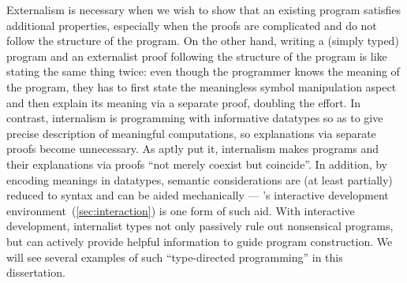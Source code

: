Externalism is necessary when we wish to show that an existing program satisfies additional properties, especially when the proofs are complicated and do not follow the structure of the program.
On the other hand, writing a (simply typed) program and an externalist proof following the structure of the program is like stating the same thing twice: even though the programmer knows the meaning of the program, they has to first state the meaningless symbol manipulation aspect and then explain its meaning via a separate proof, doubling the effort.
In contrast, internalism is programming with informative datatypes so as to give precise description of meaningful computations, so explanations via separate proofs become unnecessary.
As \citet{McBride-Epigram} aptly put it, internalism makes programs and their explanations via proofs ``not merely coexist but coincide''.
In addition, by encoding meanings in datatypes, semantic considerations are (at least partially) reduced to syntax and can be aided mechanically --- \Agda's interactive development environment~(\autoref{sec:interaction}) is one form of such aid.
With interactive development, internalist types not only passively rule out nonsensical programs, but can actively provide helpful information to guide program construction.
We will see several examples of such ``type-directed programming'' in this dissertation.

